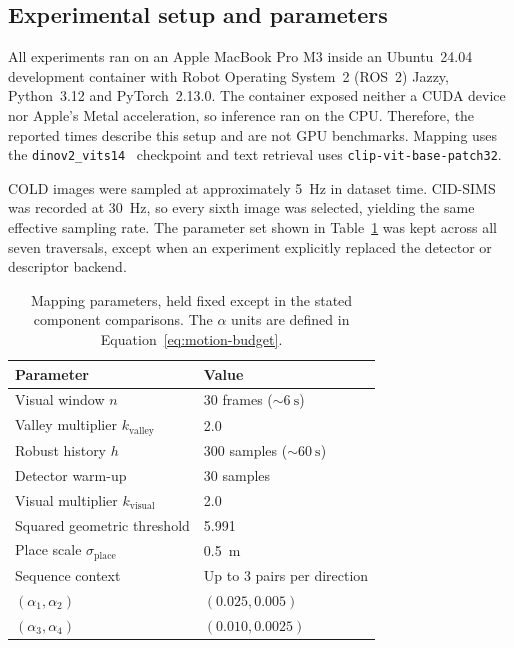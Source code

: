 \documentclass[5p,twocolumn,nonatbib,reversenotenum]{elsarticle}
\begin{document}
\subsection{Experimental setup and parameters}
All experiments ran on an Apple MacBook Pro M3 inside an Ubuntu~24.04 development container with Robot Operating System~2 (ROS~2) Jazzy, Python~3.12 and PyTorch~2.13.0. The container exposed neither a CUDA device nor Apple's Metal acceleration, so inference ran on the CPU. Therefore, the reported times describe this setup and are not GPU benchmarks. Mapping uses the \texttt{dinov2\_vits14}~\cite{oquab2024dinov2learningrobustvisual} checkpoint and text retrieval uses \texttt{clip-vit-base-patch32}.

COLD images were sampled at approximately \qty{5}{\hertz} in dataset time. CID-SIMS was recorded at \qty{30}{\hertz}, so every sixth image was selected, yielding the same effective sampling rate. The parameter set shown in Table~\ref{tab:parameters} was kept across all seven traversals, except when an experiment explicitly replaced the detector or descriptor backend.

\begin{table}[t]
\centering
\caption{Mapping parameters, held fixed except in the stated component comparisons. The $\alpha$ units are defined in Equation~\ref{eq:motion-budget}.}
\label{tab:parameters}
\small
\begin{tabular}{ll}
\hline
Parameter & Value \\
\hline
Visual window $n$ & 30 frames ($\sim\qty{6}{\second}$) \\
Valley multiplier $k_{\mathrm{valley}}$ & 2.0 \\
Robust history $h$ & 300 samples ($\sim\qty{60}{\second}$) \\
Detector warm-up & 30 samples \\
Visual multiplier $k_{\mathrm{visual}}$ & 2.0 \\
Squared geometric threshold & 5.991 \\
Place scale $\sigma_{\mathrm{place}}$ & \qty{0.5}{\metre} \\
Sequence context & Up to 3 pairs per direction \\
$(\alpha_1,\alpha_2)$ & $(0.025,0.005)$ \\
$(\alpha_3,\alpha_4)$ & $(0.010,0.0025)$ \\
\hline
\end{tabular}
\end{table}
\end{document}
